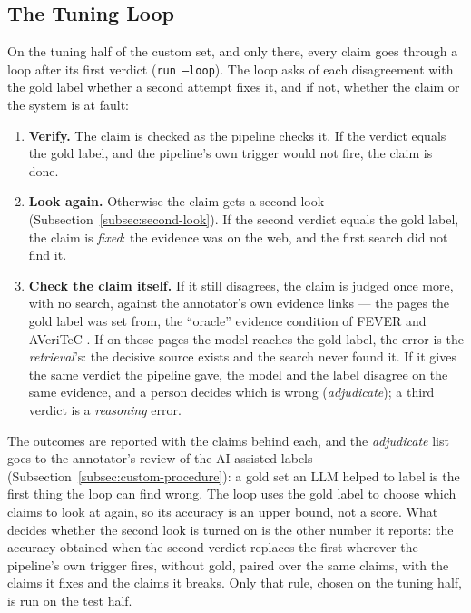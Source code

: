 
\subsection{The Tuning Loop}
\label{subsec:tuning-loop}

On the tuning half of the custom set, and only there, every claim goes
through a loop after its first verdict (\texttt{run --loop}). The loop
asks of each disagreement with the gold label whether a second attempt
fixes it, and if not, whether the claim or the system is at fault:

\begin{enumerate}
    \item \textbf{Verify.} The claim is checked as the pipeline checks
    it. If the verdict equals the gold label, and the pipeline's own
    trigger would not fire, the claim is done.
    \item \textbf{Look again.} Otherwise the claim gets a second look
    (Subsection~\ref{subsec:second-look}). If the second verdict equals
    the gold label, the claim is \emph{fixed}: the evidence was on the
    web, and the first search did not find it.
    \item \textbf{Check the claim itself.} If it still disagrees, the
    claim is judged once more, with no search, against the annotator's
    own evidence links --- the pages the gold label was set from, the
    ``oracle'' evidence condition of FEVER and AVeriTeC
    \cite{thorne2018fever,schlichtkrull2023averitec}. If on those pages
    the model reaches the gold label, the error is the
    \emph{retrieval}'s: the decisive source exists and the search never
    found it. If it gives the same verdict the pipeline gave, the model
    and the label disagree on the same evidence, and a person decides
    which is wrong (\emph{adjudicate}); a third verdict is a
    \emph{reasoning} error.
\end{enumerate}

The outcomes are reported with the claims behind each, and the
\emph{adjudicate} list goes to the annotator's review of the AI-assisted
labels (Subsection~\ref{subsec:custom-procedure}): a gold set an LLM
helped to label is the first thing the loop can find wrong. The loop
uses the gold label to choose which claims to look at again, so its
accuracy is an upper bound, not a score. What decides whether the second
look is turned on is the other number it reports: the accuracy obtained
when the second verdict replaces the first wherever the pipeline's own
trigger fires, without gold, paired over the same claims, with the
claims it fixes and the claims it breaks. Only that rule, chosen on the
tuning half, is run on the test half.

